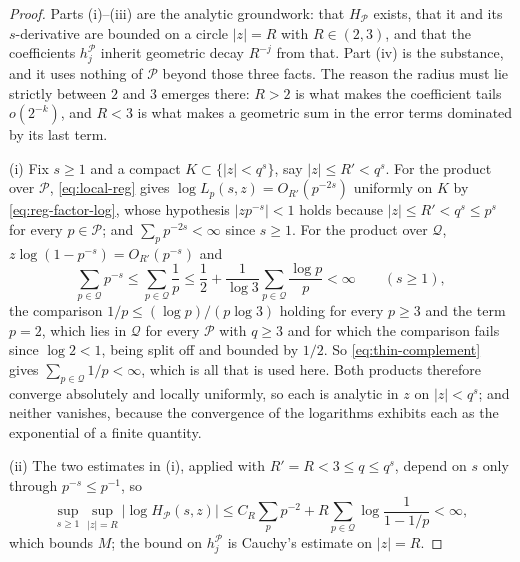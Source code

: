 \documentclass[11pt]{amsart}
\theoremstyle{plain}
\theoremstyle{definition}
\newcommand{\abs}[1]{\lvert #1\rvert}
\begin{document}
\begin{proof}
Parts (i)--(iii) are the analytic groundwork: that $H_{\mathcal P}$ exists,
that it and its $s$-derivative are bounded on a circle $\abs z=R$ with
$R\in(2,3)$, and that the coefficients $h_j^{\mathcal P}$ inherit geometric
decay $R^{-j}$ from that. Part (iv) is the substance, and it uses nothing of
$\mathcal P$ beyond those three facts. The reason the radius must lie strictly
between $2$ and $3$ emerges there: $R>2$ is what makes the coefficient tails
$o(2^{-k})$, and $R<3$ is what makes a geometric sum in the error terms
dominated by its last term.

(i) Fix $s\geq1$ and a compact $K\subset\{\abs z<q^{s}\}$, say
$\abs z\leq R'<q^{s}$. For the product over $\mathcal P$,
\eqref{eq:local-reg} gives $\log L_p(s,z)=O_{R'}(p^{-2s})$ uniformly on $K$ by
\eqref{eq:reg-factor-log}, whose
hypothesis $\abs{zp^{-s}}<1$ holds because $\abs z\leq R'<q^{s}\leq p^{s}$ for
every $p\in\mathcal P$; and $\sum_pp^{-2s}<\infty$ since $s\geq1$. For the
product over $\mathcal Q$, $z\log(1-p^{-s})=O_{R'}(p^{-s})$ and
\[
  \sum_{p\in\mathcal Q}p^{-s}
   \leq\sum_{p\in\mathcal Q}\frac1p
   \leq\frac12+\frac1{\log3}\sum_{p\in\mathcal Q}\frac{\log p}{p}<\infty
  \qquad(s\geq1),
\]
the comparison $1/p\leq(\log p)/(p\log3)$ holding for every $p\geq3$ and the
term $p=2$, which lies in $\mathcal Q$ for every $\mathcal P$ with $q\geq3$
and for which the comparison fails since $\log2<1$, being split off and
bounded by $1/2$. So \eqref{eq:thin-complement} gives
$\sum_{p\in\mathcal Q}1/p<\infty$, which is all that is used here. Both
products therefore converge absolutely and locally uniformly, so each is
analytic in $z$ on $\abs z<q^{s}$; and neither vanishes, because the
convergence of the logarithms exhibits each as the exponential of a finite
quantity.

(ii) The two estimates in (i), applied with $R'=R<3\leq q\leq q^{s}$, depend on
$s$ only through $p^{-s}\leq p^{-1}$, so
\[
  \sup_{s\geq1}\sup_{\abs z=R}\abs{\log H_{\mathcal P}(s,z)}
   \leq C_R\sum_pp^{-2}
    +R\sum_{p\in\mathcal Q}\log\frac1{1-1/p}
   <\infty,
\]
which bounds $M$; the bound on $h_j^{\mathcal P}$ is Cauchy's estimate on
$\abs z=R$.


\end{proof}
\end{document}
